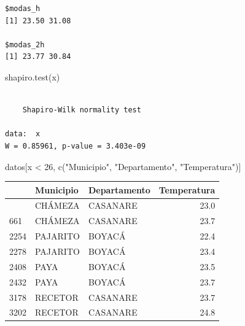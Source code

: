 \documentclass[oneside, openany, fontset=libertinus]{mitthesis}
\newenvironment{Shaded}{\begin{snugshade}}{\end{snugshade}}
\newcommand{\AttributeTok}[1]{\textcolor[rgb]{0.40,0.45,0.13}{#1}}
\newcommand{\DecValTok}[1]{\textcolor[rgb]{0.68,0.00,0.00}{#1}}
\newcommand{\FunctionTok}[1]{\textcolor[rgb]{0.28,0.35,0.67}{#1}}
\newcommand{\NormalTok}[1]{\textcolor[rgb]{0.00,0.23,0.31}{#1}}
\newcommand{\OtherTok}[1]{\textcolor[rgb]{0.00,0.23,0.31}{#1}}
\newcommand{\SpecialCharTok}[1]{\textcolor[rgb]{0.37,0.37,0.37}{#1}}
\newcommand{\StringTok}[1]{\textcolor[rgb]{0.13,0.47,0.30}{#1}}
\begin{document}
\begin{Shaded}
\end{Shaded}

\begin{verbatim}
$modas_h
[1] 23.50 31.08

$modas_2h
[1] 23.77 30.84
\end{verbatim}

\begin{Shaded}
\begin{Highlighting}[]
\FunctionTok{shapiro.test}\NormalTok{(x)}
\end{Highlighting}
\end{Shaded}

\begin{verbatim}

    Shapiro-Wilk normality test

data:  x
W = 0.85961, p-value = 3.403e-09
\end{verbatim}

\begin{Shaded}
\begin{Highlighting}[]
\NormalTok{datos[x }\SpecialCharTok{\textless{}} \DecValTok{26}\NormalTok{, }\FunctionTok{c}\NormalTok{(}\StringTok{"Municipio"}\NormalTok{, }\StringTok{"Departamento"}\NormalTok{, }\StringTok{"Temperatura"}\NormalTok{)]}
\end{Highlighting}
\end{Shaded}

{\def\LTcaptype{none} %
\begin{longtable}[]{@{}lllr@{}}
\toprule\noalign{}
& Municipio & Departamento & Temperatura \\
\midrule\noalign{}
\endhead
\bottomrule\noalign{}
\endlastfoot
637 & CHÁMEZA & CASANARE & 23.0 \\
661 & CHÁMEZA & CASANARE & 23.7 \\
2254 & PAJARITO & BOYACÁ & 22.4 \\
2278 & PAJARITO & BOYACÁ & 23.4 \\
2408 & PAYA & BOYACÁ & 23.5 \\
2432 & PAYA & BOYACÁ & 23.7 \\
3178 & RECETOR & CASANARE & 23.7 \\
3202 & RECETOR & CASANARE & 24.8 \\
\end{longtable}
}
\end{document}
